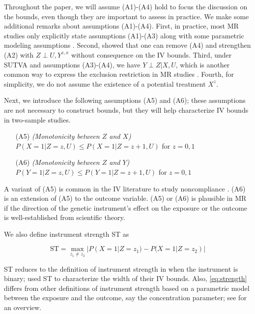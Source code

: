 \documentclass[
]{article}
\theoremstyle{plain}
\begin{document}
Throughout the paper, we will assume (A1)-(A4) hold to focus the discussion on the bounds, even though they are important to assess in practice. We make some additional remarks about assumptions (A1)-(A4). First, in practice, most MR studies only explicitly state assumptions (A1)-(A3) along with some parametric modeling assumptions \autocite{burgess_mendelian_2015}. Second, \textcite{richardson_ace_2014} showed that one can remove (A4) and strengthen (A2) with \(Z \perp U, Y^{z,x}\) without consequence on the IV bounds. Third, under SUTVA and assumptions (A3)-(A4), we have \(Y \perp Z | X, U\), which is another common way to express the exclusion restriction in MR studies \autocite{didelez_mendelian_2007,swanson_partial_2018}. Fourth, for simplicity, we do not assume the existence of a potential treatment \(X^{z}\).

Next, we introduce the following assumptions (A5) and (A6); these assumptions are not necessary to construct bounds, but they will help characterize IV bounds in two-sample studies.

\begin{itemize}
\item[(A5)] \emph{(Monotonicity between $Z$ and $X$)} $P(X = 1 | Z = z, U) \le P(X = 1 | Z = z+1, U)$ for $z=0,1$
\item[(A6)] \emph{(Monotonicity between $Z$ and $Y$)} $P(Y = 1 | Z = z, U) \le P(Y = 1 | Z = z+1, U)$ for $z=0,1$
\end{itemize}

A variant of (A5) is common in the IV literature to study noncompliance \autocite{angrist_identification_1996,baiocchi_instrumental_2014}. (A6) is an extension of (A5) to the outcome variable. (A5) or (A6) is plausible in MR if the direction of the genetic instrument's effect on the exposure or the outcome is well-established from scientific theory.

We also define instrument strength ST as

\begin{equation}
\text{ST} = \max_{z_1 \neq z_2} | P(X = 1 | Z = z_1) - P(X = 1 | Z = z_2) | \label{eq:strength}
\end{equation}

ST reduces to the definition of instrument strength in \textcite{balke_bounds_1997} when the instrument is binary; \textcite{balke_bounds_1997} used ST to characterize the width of their IV bounds. Also, \eqref{eq:strength} differs from other definitions of instrument strength based on a parametric model between the exposure and the outcome, say the concentration parameter; see \textcite{stock_survey_2002} for an overview.
\end{document}
